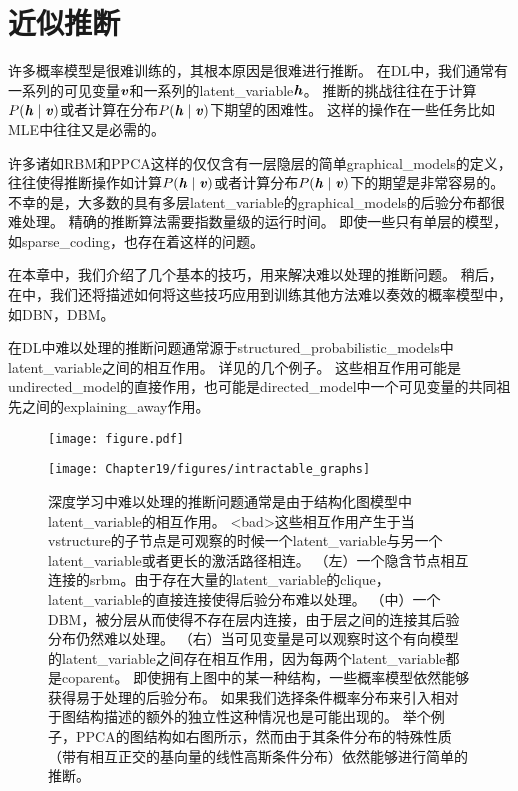 \chapter{近似推断}
\label{chap:approximate_inference}


许多概率模型是很难训练的，其根本原因是很难进行推断。
在\gls{DL}中，我们通常有一系列的可见变量$\boldsymbol{\mathit{v}}$和一系列的\gls{latent_variable}$\boldsymbol{\mathit{h}}$。
推断的挑战往往在于计算$P(\boldsymbol{\mathit{h}}\mid\boldsymbol{\mathit{v}})$或者计算在分布$P(\boldsymbol{\mathit{h}}\mid\boldsymbol{\mathit{v}})$下期望的困难性。
这样的操作在一些任务比如\gls{MLE}中往往又是必需的。

许多诸如\gls{RBM}和\gls{PPCA}这样的仅仅含有一层隐层的简单\gls{graphical_models}的定义，往往使得推断操作如计算$P(\boldsymbol{\mathit{h}}\mid\boldsymbol{\mathit{v}})$或者计算分布$P(\boldsymbol{\mathit{h}}\mid\boldsymbol{\mathit{v}})$下的期望是非常容易的。
不幸的是，大多数的具有多层\gls{latent_variable}的\gls{graphical_models}的后验分布都很难处理。
精确的推断算法需要指数量级的运行时间。
即使一些只有单层的模型，如\gls{sparse_coding}，也存在着这样的问题。


在本章中，我们介绍了几个基本的技巧，用来解决难以处理的推断问题。
稍后，在中，我们还将描述如何将这些技巧应用到训练其他方法难以奏效的概率模型中，如\gls{DBN}，\gls{DBM}。


在\gls{DL}中难以处理的推断问题通常源于\gls{structured_probabilistic_models}中\gls{latent_variable}之间的相互作用。
详见的几个例子。
这些相互作用可能是\gls{undirected_model}的直接作用，也可能是\gls{directed_model}中一个可见变量的共同祖先之间的\gls{explaining_away}作用。


\begin{figure}[!htb]
\ifOpenSource
\centerline{\texttt{[image: figure.pdf]}}
\else
	\centerline{\texttt{[image: Chapter19/figures/intractable\_graphs]}}
\fi
	\caption{深度学习中难以处理的推断问题通常是由于结构化图模型中\gls{latent_variable}的相互作用。
	<bad>这些相互作用产生于当\gls{vstructure}的子节点是可观察的时候一个\gls{latent_variable}与另一个\gls{latent_variable}或者更长的激活路径相连。
	（左）一个隐含节点相互连接的\gls{srbm}\citep{Osindero+Hinton-2008}。由于存在大量的\gls{latent_variable}的\gls{clique}，\gls{latent_variable}的直接连接使得后验分布难以处理。
	（中）一个\gls{DBM}，被分层从而使得不存在层内连接，由于层之间的连接其后验分布仍然难以处理。
	（右）当可见变量是可以观察时这个有向模型的\gls{latent_variable}之间存在相互作用，因为每两个\gls{latent_variable}都是\gls{coparent}。
	即使拥有上图中的某一种结构，一些概率模型依然能够获得易于处理的后验分布。
	如果我们选择条件概率分布来引入相对于图结构描述的额外的独立性这种情况也是可能出现的。
	举个例子，\gls{PPCA}的图结构如右图所示，然而由于其条件分布的特殊性质（带有相互正交的基向量的线性高斯条件分布）依然能够进行简单的推断。}
	\label{fig:intractable_graphs}
\end{figure}


